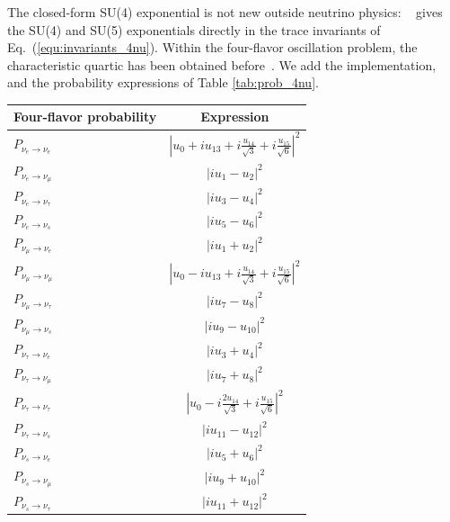 \documentclass[final,5p,times,twocolumn,sort,compress]{elsarticle}
\newcommand{\eq}{Eq.}
\providecommand{\Ref}{}
\newcommand{\equ}[1]{\eq~(\ref{equ:#1})}
\begin{document}
The closed-form SU(4) exponential is not new outside neutrino physics: \Ref\ \cite{VanKortryk:2015kua} gives the SU(4) and SU(5) exponentials directly in the trace invariants of \equ{invariants_4nu}.  Within the four-flavor oscillation problem, the characteristic quartic has been obtained before\ \cite{Kamo:2002sj}.  We add the implementation, and the probability expressions of Table \ref{tab:prob_4nu}.

{\def\arraystretch{1.3}
\begin{table}[t!]
 \begin{tabular}{lc}
  Four-flavor probability & Expression \\
  \hline
  $P_{\nu_e \to \nu_e}$        & $\left\vert u_0 + i u_{13} + i \frac{u_{14}}{\sqrt{3}} + i \frac{u_{15}}{\sqrt{6}} \right\vert^2$ \\
  $P_{\nu_e \to \nu_\mu}$      & $\left\vert i u_1 - u_2 \right\vert^2$ \\
  $P_{\nu_e \to \nu_\tau}$     & $\left\vert i u_3 - u_4 \right\vert^2$ \\
  $P_{\nu_e \to \nu_s}$        & $\left\vert i u_5 - u_6 \right\vert^2$ \\
  $P_{\nu_\mu \to \nu_e}$      & $\left\vert i u_1 + u_2 \right\vert^2$ \\
  $P_{\nu_\mu \to \nu_\mu}$    & $\left\vert u_0 - i u_{13} + i \frac{u_{14}}{\sqrt{3}} + i \frac{u_{15}}{\sqrt{6}} \right\vert^2$ \\
  $P_{\nu_\mu \to \nu_\tau}$   & $\left\vert i u_7 - u_8 \right\vert^2$ \\
  $P_{\nu_\mu \to \nu_s}$      & $\left\vert i u_9 - u_{10} \right\vert^2$ \\
  $P_{\nu_\tau \to \nu_e}$     & $\left\vert i u_3 + u_4 \right\vert^2$ \\
  $P_{\nu_\tau \to \nu_\mu}$   & $\left\vert i u_7 + u_8 \right\vert^2$ \\
  $P_{\nu_\tau \to \nu_\tau}$  & $\left\vert u_0 - i \frac{2 u_{14}}{\sqrt{3}} + i \frac{u_{15}}{\sqrt{6}} \right\vert^2$ \\
  $P_{\nu_\tau \to \nu_s}$     & $\left\vert i u_{11} - u_{12} \right\vert^2$ \\
  $P_{\nu_s \to \nu_e}$        & $\left\vert i u_5 + u_6 \right\vert^2$ \\
  $P_{\nu_s \to \nu_\mu}$      & $\left\vert i u_9 + u_{10} \right\vert^2$ \\
  $P_{\nu_s \to \nu_\tau}$     & $\left\vert i u_{11} + u_{12} \right\vert^2$ \\

\end{tabular}
\end{table}}
\end{document}
